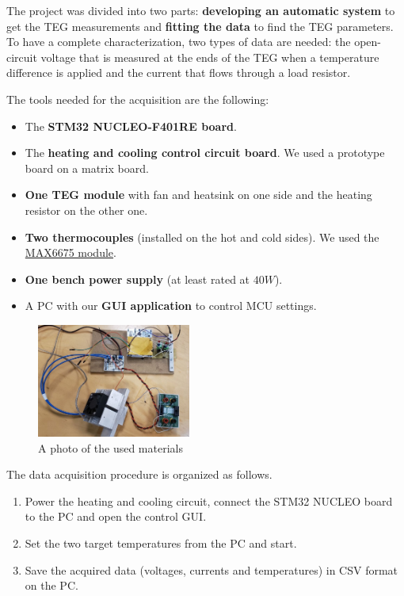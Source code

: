 The project was divided into two parts: \textbf{developing an automatic system} to get the TEG measurements and \textbf{fitting the data} to find the TEG parameters.
To have a complete characterization, two types of data are needed: the open-circuit voltage that is measured at the ends of the TEG when a temperature difference is applied and the current that flows through a load resistor.

The tools needed for the acquisition are the following:
\begin{itemize}
  \item The \textbf{STM32 NUCLEO-F401RE board}.
  \item The \textbf{heating and cooling control circuit board}. We used a prototype board on a matrix board.
  \item \textbf{One TEG module} with fan and heatsink on one side and the heating resistor on the other one.
  \item \textbf{Two thermocouples} (installed on the hot and cold sides). We used the \href{https://www.analog.com/media/en/technical-documentation/data-sheets/MAX6675.pdf}{MAX6675 module}.
  \item \textbf{One bench power supply} (at least rated at \(40 W\)).
  \item A PC with our \textbf{GUI application} to control MCU settings.
\end{itemize}

\begin{figure}[h]
  \centering
  \includegraphics[width=0.45\textwidth]{assets/all_project_photo2.jpg}
  \caption{A photo of the used materials}
\end{figure}

The data acquisition procedure is organized as follows.
\begin{enumerate}
  \item Power the heating and cooling circuit, connect the STM32 NUCLEO board to the PC and open the control GUI.
  \item Set the two target temperatures from the PC and start.
  \item Save the acquired data (voltages, currents and temperatures) in CSV format on the PC.
\end{enumerate}

